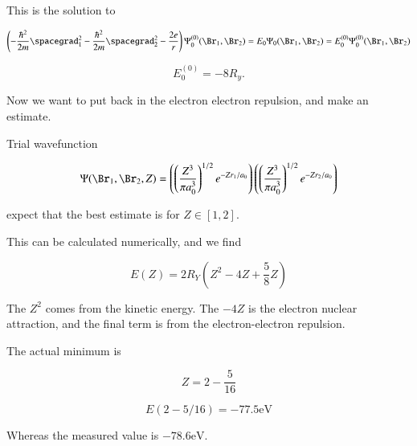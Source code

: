 This is the solution to

\begin{equation}\label{eqn:qmTwoL2:610}
\left(
-\frac{\hbar^2}{2 m} \spacegrad_1^2
-\frac{\hbar^2}{2 m} \spacegrad_2^2
- \frac{2 e}{r}
\right)
\Psi_0^{(0)}(\Br_1, \Br_2) = E_0 \Psi_0(\Br_1, \Br_2)
=
E_0^{(0)} \Psi_0^{(0)}(\Br_1, \Br_2)
\end{equation}

\begin{equation}\label{eqn:qmTwoL2:630}
E_0^{(0)} = - 8 R_y.
\end{equation}

Now we want to put back in the electron electron repulsion, and make an estimate.

Trial wavefunction

\begin{equation}\label{eqn:qmTwoL2:650}
\Psi(\Br_1, \Br_2, Z) =
\left(
\left(\frac{Z^3}{ \pi a_0^3 }\right)^{1/2} e^{-Z r_1/a_0}
\right)
\left(
\left(\frac{Z^3}{ \pi a_0^3 }\right)^{1/2} e^{-Z r_2/a_0}
\right)
\end{equation}

expect that the best estimate is for $Z \in [1,2]$.

This can be calculated numerically, and we find

\begin{equation}\label{eqn:qmTwoL2:670}
E(Z) = 2 R_Y \left( Z^2 - 4 Z + \frac{5}{8} Z \right)
\end{equation}

The $Z^2$ comes from the kinetic energy.  The $-4 Z$ is the electron nuclear attraction, and the final term is from the electron-electron repulsion.

The actual minimum is

\begin{equation}\label{eqn:qmTwoL2:690}
Z = 2 - \frac{5}{16}
\end{equation}

\begin{equation}\label{eqn:qmTwoL2:710}
E(2 - 5/16) = -77.5 \text{eV}
\end{equation}

Whereas the measured value is $-78.6 \text{eV}$.

\EndArticle
